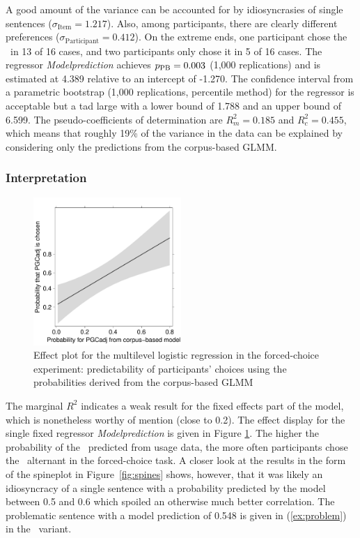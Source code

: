 A good amount of the variance can be accounted for by idiosyncrasies of single sentences ($\sigma_{\text{Item}}=1.217$).
Also, among participants, there are clearly different preferences ($\sigma_{\text{Participant}}=0.412$).
On the extreme ends, one participant chose the \PGCa\ in 13 of 16 cases, and two participants only chose it in 5 of 16 cases.
The regressor \textit{Modelprediction} achieves $p_{\text{PB}}=0.003$ (1,000 replications) and is estimated at 4.389 relative to an intercept of -1.270.
The confidence interval from a parametric bootstrap (1,000 replications, percentile method) for the regressor is acceptable but a tad large with a lower bound of 1.788 and an upper bound of 6.599.
The pseudo-coefficients of determination are $R^2_{m}=0.185$ and $R^2_{c}=0.455$, which means that roughly 19\% of the variance in the data can be explained by considering only the predictions from the corpus-based GLMM.

\subsubsection{Interpretation}

\begin{figure}[htbp!]
\centering
\includegraphics[width=0.5\textwidth]{../R/output/fc_effects}
\caption{Effect plot for the multilevel logistic regression in the forced-choice experiment: predictability of participants' choices using the probabilities derived from the corpus-based GLMM}
\label{fig:afc:effects}
\end{figure}

The marginal $R^2$ indicates a weak result for the fixed effects part of the model, which is nonetheless worthy of mention (close to 0.2).
The effect display for the single fixed regressor \textit{Modelprediction} is given in Figure \ref{fig:afc:effects}.
The higher the probability of the \PGCa\ predicted from usage data, the more often participants chose the \PGCa\ alternant in the forced-choice task.
A closer look at the results in the form of the spineplot in Figure~\ref{fig:spines} shows, however, that it was likely an idiosyncracy of a single sentence with a probability predicted by the model between 0.5 and 0.6 which spoiled an otherwise much better correlation.
The problematic sentence with a model prediction of 0.548 is given in (\ref{ex:problem}) in the \PGCa\ variant.

